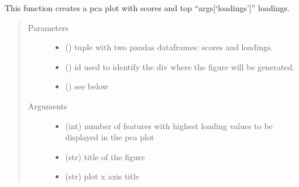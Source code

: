 \documentclass[letterpaper,10pt,english]{sphinxmanual}
\begin{document}
\begin{fulllineitems}
\end{fulllineitems}


\begin{fulllineitems}
\label{\detokenize{_autosummary/analytics_core.viz:analytics_core.viz.viz.get_pca_plot}}
This function creates a pca plot with scores and top “args{[}‘loadings’{]}” loadings.
\begin{quote}\begin{description}
\item[{Parameters}] \leavevmode\begin{itemize}
\item {} 
 () \textendash{} tuple with two pandas dataframes: scores and loadings.

\item {} 
 () \textendash{} id used to identify the div where the figure will be generated.

\item {} 
 () \textendash{} see below

\end{itemize}

\item[{Arguments}] \leavevmode\begin{itemize}
\item {} 
 (int) \textendash{} number of features with highest loading values to be displayed in the pca plot

\item {} 
 (str) \textendash{} title of the figure

\item {} 
 (str) \textendash{} plot x axis title


\end{itemize}
\end{description}
\end{quote}
\end{fulllineitems}
\end{document}
